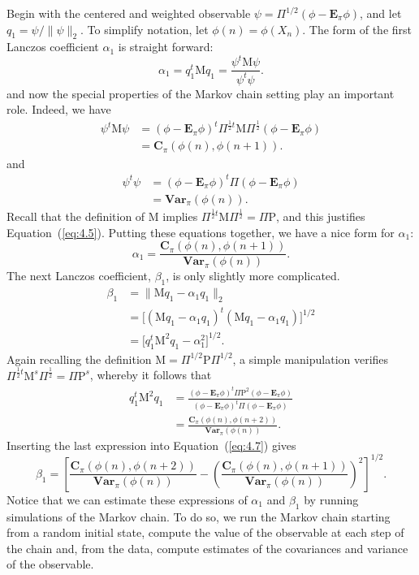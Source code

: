 \documentclass[12pt,letterpaper]{report}
\theoremstyle{plain}
\theoremstyle{definition}
\theoremstyle{remark}
\numberwithin{theorem}{chapter}
\numberwithin{claim}{chapter}
\numberwithin{equation}{chapter}
\numberwithin{conjecture}{chapter}
\newcommand\bC{\ensuremath{\mathbf{C}}}
\renewcommand\P{\ensuremath{\mathrm{P}}}
\newcommand\M{\ensuremath{\mathrm{M}}}
\newcommand\bE{\ensuremath{\mathbf{E}}}
\newcommand\Var{\ensuremath{\mathbf{Var}}}
\newcommand\<{\ensuremath{\langle}}
\renewcommand\>{\ensuremath{\rangle}}
\begin{document}
Begin with the centered and weighted observable 
$\psi = \Pi^{1/2} (\phi - \bE_\pi\phi)$,
and let $q_1 = \psi/\|\psi\|_2$.
To simplify notation, let $\phi(n) = \phi(X_n)$. 
The form of the first Lanczos coefficient $\alpha_1$ is straight
forward:
\[
\alpha_1 = q_1^t \M q_1  = \frac{\psi^t\M\psi}{\psi^t\psi}.
\]
and now the special properties of the Markov chain setting play an important
role. Indeed, we have
\begin{align}
\label{eq:4.5}
\psi^t\M\psi &= (\phi - \bE_\pi\phi)^t\Pi^{\frac{1}{2}t}\M\Pi^{\frac{1}{2}}(\phi- \bE_\pi \phi)\nonumber\\
&= \bC_\pi (\phi(n), \phi(n + 1)).
\end{align}
and
\begin{align}
\label{eq:4.6}
\psi^t\psi &= (\phi - \bE_\pi\phi)^t\Pi(\phi- \bE_\pi \phi)\nonumber\\
&= \Var_\pi(\phi(n)).
\end{align}
Recall that the definition of $\M$ implies 
$\Pi^{\frac{1}{2}t}\M\Pi^{\frac{1}{2}}= \Pi \P$, and this justifies 
Equation~(\ref{eq:4.5}). Putting
%
%
%
%
these equations together, we have a nice form for $\alpha_1$:
\[
\alpha_1= \frac{\bC_\pi (\phi(n), \phi(n + 1))}{\Var_\pi(\phi(n))}.
\]
The next Lanczos coefficient, $\beta_1$, is only slightly more complicated.
\begin{align}
\label{eq:4.7}
\beta_1 &= \|\M q_1 - \alpha_1 q_1\|_2 \nonumber\\
&= \bigl[(\M q_1 - \alpha_1 q_1)^t(\M q_1 - \alpha_1 q_1)\bigr]^{1/2}\nonumber\\
&= \bigl[q_1^t\M^2 q_1 - \alpha^2_1\bigr]^{1/2}.
\end{align}
Again recalling the definition $\M =\Pi^{1/2}\P\Pi^{1/2}$, a simple manipulation verifies
$\Pi^{\frac{1}{2}t}\M^s\Pi^{\frac{1}{2}} = \Pi \P^s$,
whereby it follows that
\begin{align*}
q_1^t\M^2 q_1  &= \frac{(\phi - \bE_\pi\phi)^t\Pi \P^2(\phi- \bE_\pi \phi)}
{(\phi - \bE_\pi\phi)^t\Pi (\phi- \bE_\pi \phi)} \\[8pt]
&= \frac{\bC_\pi (\phi(n), \phi(n + 2))}{\Var_\pi(\phi(n))}.
\end{align*}
Inserting the last expression into Equation~(\ref{eq:4.7}) gives
\[
\beta_1 = \left[\frac{\bC_\pi (\phi(n), \phi(n + 2))}{\Var_\pi(\phi(n))}
-\left( \frac{\bC_\pi (\phi(n), \phi(n + 1))}{\Var_\pi(\phi(n))}\right)^2
\right]^{1/2}.
\]
Notice that we can estimate these expressions of $\alpha_1$ and $\beta_1$ by
running simulations of the Markov chain. 
To do so, we run the Markov chain starting from a random initial state, compute the value of
the observable at each step of the chain and, from the data, compute estimates of the covariances
and variance of the observable.
\end{document}
